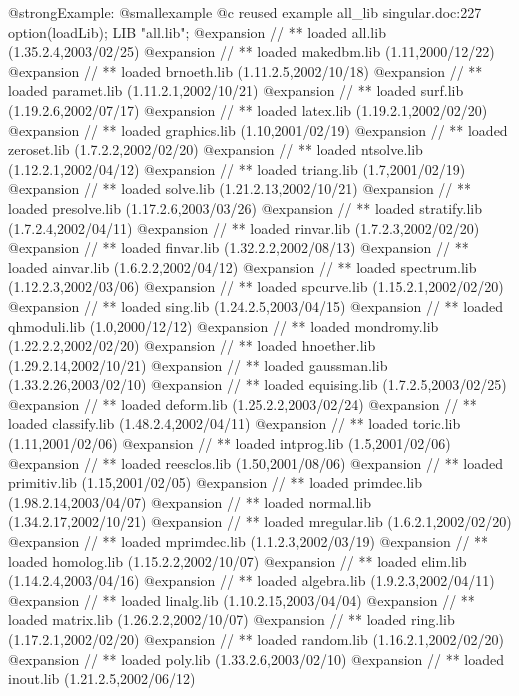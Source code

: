 @strong{Example:}
@smallexample
@c reused example all_lib singular.doc:227 
option(loadLib);
LIB "all.lib";
@expansion{} // ** loaded all.lib (1.35.2.4,2003/02/25)
@expansion{} // ** loaded makedbm.lib (1.11,2000/12/22)
@expansion{} // ** loaded brnoeth.lib (1.11.2.5,2002/10/18)
@expansion{} // ** loaded paramet.lib (1.11.2.1,2002/10/21)
@expansion{} // ** loaded surf.lib (1.19.2.6,2002/07/17)
@expansion{} // ** loaded latex.lib (1.19.2.1,2002/02/20)
@expansion{} // ** loaded graphics.lib (1.10,2001/02/19)
@expansion{} // ** loaded zeroset.lib (1.7.2.2,2002/02/20)
@expansion{} // ** loaded ntsolve.lib (1.12.2.1,2002/04/12)
@expansion{} // ** loaded triang.lib (1.7,2001/02/19)
@expansion{} // ** loaded solve.lib (1.21.2.13,2002/10/21)
@expansion{} // ** loaded presolve.lib (1.17.2.6,2003/03/26)
@expansion{} // ** loaded stratify.lib (1.7.2.4,2002/04/11)
@expansion{} // ** loaded rinvar.lib (1.7.2.3,2002/02/20)
@expansion{} // ** loaded finvar.lib (1.32.2.2,2002/08/13)
@expansion{} // ** loaded ainvar.lib (1.6.2.2,2002/04/12)
@expansion{} // ** loaded spectrum.lib (1.12.2.3,2002/03/06)
@expansion{} // ** loaded spcurve.lib (1.15.2.1,2002/02/20)
@expansion{} // ** loaded sing.lib (1.24.2.5,2003/04/15)
@expansion{} // ** loaded qhmoduli.lib (1.0,2000/12/12)
@expansion{} // ** loaded mondromy.lib (1.22.2.2,2002/02/20)
@expansion{} // ** loaded hnoether.lib (1.29.2.14,2002/10/21)
@expansion{} // ** loaded gaussman.lib (1.33.2.26,2003/02/10)
@expansion{} // ** loaded equising.lib (1.7.2.5,2003/02/25)
@expansion{} // ** loaded deform.lib (1.25.2.2,2003/02/24)
@expansion{} // ** loaded classify.lib (1.48.2.4,2002/04/11)
@expansion{} // ** loaded toric.lib (1.11,2001/02/06)
@expansion{} // ** loaded intprog.lib (1.5,2001/02/06)
@expansion{} // ** loaded reesclos.lib (1.50,2001/08/06)
@expansion{} // ** loaded primitiv.lib (1.15,2001/02/05)
@expansion{} // ** loaded primdec.lib (1.98.2.14,2003/04/07)
@expansion{} // ** loaded normal.lib (1.34.2.17,2002/10/21)
@expansion{} // ** loaded mregular.lib (1.6.2.1,2002/02/20)
@expansion{} // ** loaded mprimdec.lib (1.1.2.3,2002/03/19)
@expansion{} // ** loaded homolog.lib (1.15.2.2,2002/10/07)
@expansion{} // ** loaded elim.lib (1.14.2.4,2003/04/16)
@expansion{} // ** loaded algebra.lib (1.9.2.3,2002/04/11)
@expansion{} // ** loaded linalg.lib (1.10.2.15,2003/04/04)
@expansion{} // ** loaded matrix.lib (1.26.2.2,2002/10/07)
@expansion{} // ** loaded ring.lib (1.17.2.1,2002/02/20)
@expansion{} // ** loaded random.lib (1.16.2.1,2002/02/20)
@expansion{} // ** loaded poly.lib (1.33.2.6,2003/02/10)
@expansion{} // ** loaded inout.lib (1.21.2.5,2002/06/12)
